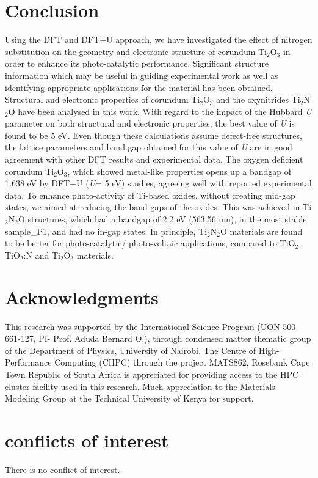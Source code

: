 \documentclass[aps,prb,superscriptaddress,twocolumn,floatfix,showpacs,amsmath]{revtex4-1}
\begin{document}
\section{Conclusion}
Using the DFT and DFT+U approach, we have investigated the effect of nitrogen substitution on the geometry and electronic structure of corundum Ti$_{2}$O$_{3}$ in order to enhance its photo-catalytic performance. Significant structure information which may be useful in guiding experimental work as well as identifying appropriate applications for the material has been obtained. Structural and electronic properties of corundum Ti$_{2}$O$_{3}$ and the oxynitrides Ti$_{2}$N$_{2}$O have been analysed in this work. With regard to the impact of the Hubbard \textit{U} parameter on both structural and electronic properties, the best value of \textit{U} is found to be  5 eV. Even though these calculations assume defect-free structures, the lattice parameters and band gap obtained for this value of \textit{U} are in good agreement with other DFT results and experimental data. The oxygen deficient corundum Ti$_{2}$O$_{3}$, which showed metal-like properties opens up a bandgap of 1.638 eV by DFT+U (\textit{U}= 5 eV) studies, agreeing well with reported experimental data. To enhance photo-activity of Ti-based oxides, without creating mid-gap states, we aimed at reducing the band gaps of the oxides. This was achieved in Ti$_{2}$N$_{2}$O structures, which had a bandgap of 2.2 eV (563.56 nm), in the most stable sample\_P1, and had no in-gap states. In principle, Ti$_{2}$N$_{2}$O materials are found to be better for photo-catalytic/ photo-voltaic applications, compared to TiO$_{2}$, TiO$_{2}$:N and Ti$_{2}$O$_{3}$ materials.

\section{Acknowledgments}
This research was supported by the International Science Program (UON 500-661-127, PI- Prof. Aduda Bernard O.), through condensed matter thematic group of the Department of Physics, University of Nairobi. The Centre of High-Performance Computing (CHPC) through the project MATS862, Rosebank Cape Town Republic of South Africa is appreciated for providing access to the HPC cluster facility used in this research. Much appreciation to the Materials Modeling Group at the Technical University of Kenya for support.

\section{conflicts of interest}
There is no conflict of interest.


\end{document}
